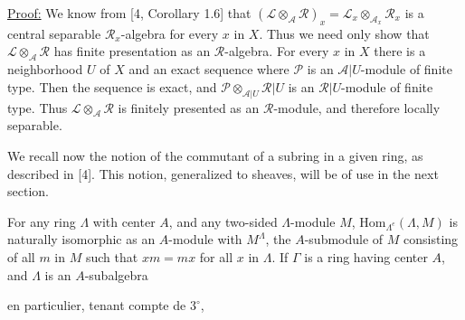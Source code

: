 \uline{Proof:} We know from [4, Corollary 1.6] that $(\mathcal{L}\otimes_{\mathcal{A}}\mathcal{R})_x=\mathcal{L}_x\otimes_{\mathcal{A}_x}\mathcal{R}_x$ is a central separable $\mathcal{R}_x$-algebra for every $x$ in $X$.
Thus we need only show that $\mathcal{L}\otimes_{\mathcal{A}}\mathcal{R}$ has finite presentation as an $\mathcal{R}$-algebra. For every $x$ in $X$ there is a neighborhood $U$ of $X$ and an exact sequence
where $\mathcal{P}$ is an $\mathcal{A}|U$-module of finite type. Then the sequence
is exact, and $\mathcal{P}\otimes_{\mathcal{A}|U}\mathcal{R}|U$ is an $\mathcal{R}|U$-module of finite type. Thus $\mathcal{L}\otimes_{\mathcal{A}}\mathcal{R}$ is finitely presented as an $\mathcal{R}$-module, and therefore locally separable.

We recall now the notion of the commutant of a subring in a given ring, as described in [4]. This notion, generalized to sheaves, will be of use in the next section.

For any ring $\Lambda$ with center $A$, and any two-sided $\Lambda$-module $M$, $\mathrm{Hom}_{\Lambda^e}(\Lambda,M)$ is naturally isomorphic as an $A$-module with $M^\Lambda$, the $A$-submodule of $M$ consisting of all $m$ in $M$ such that $xm=mx$ for all $x$ in $\Lambda$. If $\Gamma$ is a ring having center $A$, and $\Lambda$ is an $A$-subalgebra



en particulier, tenant compte de $3^\circ$,

